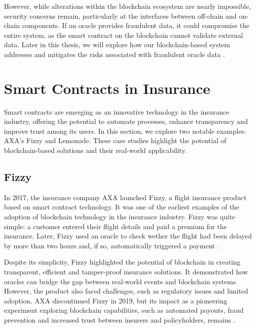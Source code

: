 However, while alterations within the blockchain ecosystem are nearly impossible, security concerns remain, particularly at the interfaces between off-chain and on-chain components. If an oracle provides fraudulent data, it could compromise the entire system, as the smart contract on the blockchain cannot validate external data. Later in this thesis, we will explore how our blockchain-based system addresses and mitigates the risks associated with fraudulent oracle data \autocite{Khan2022Investigation}.

\section{Smart Contracts in Insurance}\label{section:smart_contracts_insurance}
Smart contracts are emerging as an innovative technology in the insurance industry, offering the potential to automate processes, enhance transparency and improve trust among its users. In this section, we explore two notable examples: AXA's Fizzy and Lemonade. These case studies highlight the potential of blockchain-based solutions and their real-world applicability.

\subsection{Fizzy}
In 2017, the insurance company AXA launched Fizzy, a flight insurance product based on smart contract technology. It was one of the earliest examples of the adoption of blockchain technology in the insurance industry. Fizzy was quite simple: a customer entered their flight details and paid a premium for the insurance. Later, Fizzy used an oracle to check wether the flight had been delayed by more than two hours and, if so, automatically triggered a payment \autocite{hoffmann2021double}.

Despite its simplicity, Fizzy highlighted the potential of blockchain in creating transparent, efficient and tamper-proof insurance solutions. It demonstrated how oracles can bridge the gap between real-world events and blockchain systems. However, the product also faced challenges, such as regulatory issues and limited adoption. AXA discontinued Fizzy in 2019, but its impact as a pioneering experiment exploring blockchain capabilities, such as automated payouts, fraud prevention and increased trust between insurers and policyholders, remains \autocite{sedkaoui2021blockchain}.

